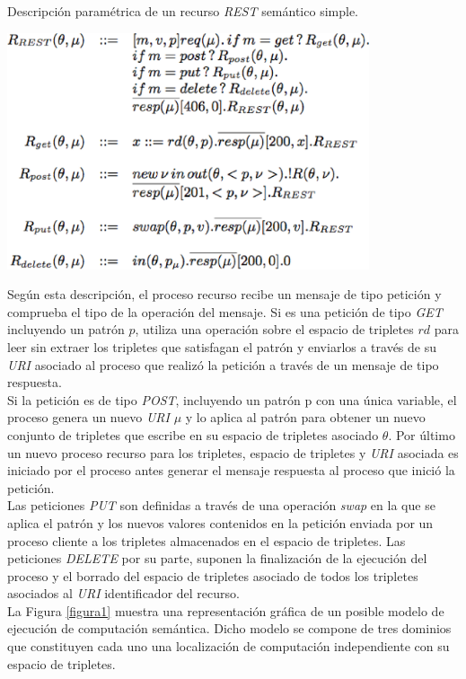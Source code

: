 \begin{table}
\vspace{2.4in}
\caption{Descripci\'on param\'etrica de un recurso \textit{REST} sem\'antico simple.}
\includegraphics[width=0.8\textwidth]{tabla4}
\label{tabla4}
\end{table}


Seg\'un esta descripci\'on, el proceso recurso recibe un mensaje de tipo petici\'on y comprueba el tipo de la operaci\'on del mensaje.
Si es una petici\'on de tipo \textit{GET} incluyendo un patr\'on $p$, utiliza una operaci\'on sobre el espacio de tripletes $rd$ para leer sin extraer los tripletes que satisfagan el patr\'on y enviarlos a trav\'es de su \textit{URI} asociado al proceso que realiz\'o la petici\'on a trav\'es de un mensaje de tipo respuesta.\\
Si la petici\'on es de tipo \textit{POST}, incluyendo un patr\'on p con una \'unica variable, el proceso genera un nuevo \textit{URI} $\mu$ y lo aplica al patr\'on para obtener un nuevo conjunto de tripletes que escribe en su espacio de tripletes asociado $\theta$. Por \'ultimo un nuevo proceso recurso para los tripletes, espacio de tripletes y \textit{URI} asociada es iniciado por el proceso antes generar el mensaje respuesta al proceso que inici\'o la petici\'on.\\
Las peticiones \textit{PUT} son definidas a trav\'es de una operaci\'on \textit{swap} en la que se aplica el patr\'on y los nuevos valores contenidos en la petici\'on enviada por un proceso cliente a los tripletes almacenados en el espacio de tripletes. Las peticiones \textit{DELETE} por su parte, suponen la finalizaci\'on de la ejecuci\'on del proceso y el borrado del espacio de tripletes asociado de todos los tripletes asociados al \textit{URI} identificador del recurso.\\
La Figura \ref{figura1} muestra una representaci\'on gr\'afica de un posible modelo de ejecuci\'on de computaci\'on sem\'antica. Dicho modelo se compone de tres dominios que constituyen cada uno una localizaci\'on de computaci\'on independiente con su espacio de tripletes.\\

